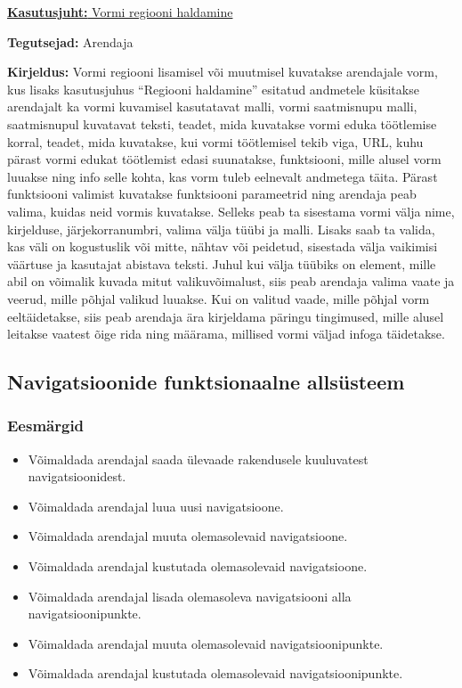 \documentclass[a4paper,12pt]{article} %
\begin{document}
\underline{\textbf{Kasutusjuht:} Vormi regiooni haldamine}
\par
\textbf{Tegutsejad:} Arendaja
\par
\textbf{Kirjeldus:} Vormi regiooni lisamisel või muutmisel kuvatakse arendajale vorm, kus lisaks kasutusjuhus ``Regiooni haldamine'' esitatud andmetele küsitakse arendajalt ka vormi kuvamisel kasutatavat malli, vormi saatmisnupu malli, saatmisnupul kuvatavat teksti, teadet, mida kuvatakse vormi eduka töötlemise korral, teadet, mida kuvatakse, kui vormi töötlemisel tekib viga, URL, kuhu pärast vormi edukat töötlemist edasi suunatakse, funktsiooni, mille alusel vorm luuakse ning info selle kohta, kas vorm tuleb eelnevalt andmetega täita. Pärast funktsiooni valimist kuvatakse funktsiooni parameetrid ning arendaja peab valima, kuidas neid vormis kuvatakse. Selleks peab ta sisestama vormi välja nime, kirjelduse, järjekorranumbri, valima välja tüübi ja malli. Lisaks saab ta valida, kas väli on kogustuslik või mitte, nähtav või peidetud, sisestada välja vaikimisi väärtuse ja kasutajat abistava teksti. Juhul kui välja tüübiks on element, mille abil on võimalik kuvada mitut valikuvõimalust, siis peab arendaja valima vaate ja veerud, mille põhjal valikud luuakse. Kui on valitud vaade, mille põhjal vorm eeltäidetakse, siis peab arendaja ära kirjeldama päringu tingimused, mille alusel leitakse vaatest õige rida ning määrama, millised vormi väljad infoga täidetakse.

\subsection{Navigatsioonide funktsionaalne allsüsteem}
\subsubsection{Eesmärgid}
\begin{itemize}
\item Võimaldada arendajal saada ülevaade rakendusele kuuluvatest navigatsioonidest.
\item Võimaldada arendajal luua uusi navigatsioone.
\item Võimaldada arendajal muuta olemasolevaid navigatsioone.
\item Võimaldada arendajal kustutada olemasolevaid navigatsioone.
\item Võimaldada arendajal lisada olemasoleva navigatsiooni alla navigatsioonipunkte.
\item Võimaldada arendajal muuta olemasolevaid navigatsioonipunkte.
\item Võimaldada arendajal kustutada olemasolevaid navigatsioonipunkte.
\end{itemize}
\end{document}
